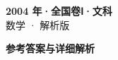 \documentclass[zihao=-4, a4paper]{ctexart}
\begin{document}
\begin{center}
  {\Large\bfseries 2004 年·全国卷Ⅰ·文科}\\[4pt]
  {\large 数学 · 解析版}
\end{center}
\medskip
{}

\clearpage
{}
\begin{center}{\Large\bfseries 参考答案与详细解析}\end{center}
\medskip

\end{document}
